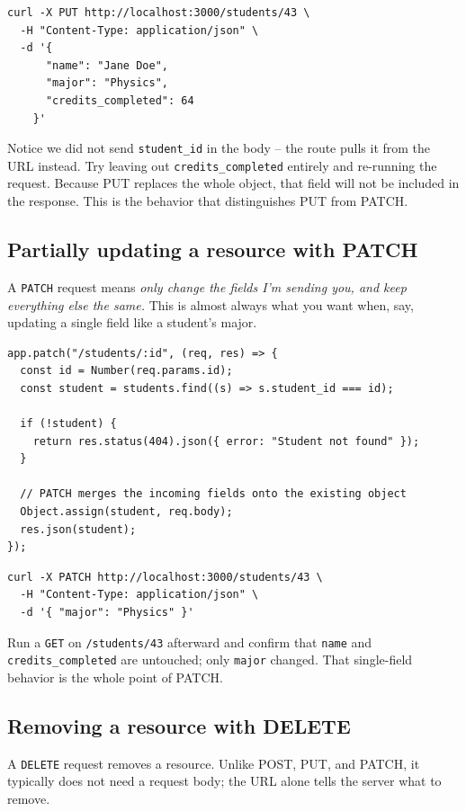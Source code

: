 \begin{verbatim}
curl -X PUT http://localhost:3000/students/43 \
  -H "Content-Type: application/json" \
  -d '{
      "name": "Jane Doe",
      "major": "Physics",
      "credits_completed": 64
    }'
\end{verbatim}

Notice we did not send \texttt{student\_id} in the body -- the route
pulls it from the URL instead. Try leaving out
\texttt{credits\_completed} entirely and re-running the request. Because
PUT replaces the whole object, that field will not be included in the
response. This is the behavior that distinguishes PUT from PATCH.

\subsection{Partially updating a resource with PATCH}

A \texttt{PATCH} request means \emph{only change the fields I'm
  sending you, and keep everything else the same.} This is almost always
what you want when, say, updating a single field like a student's
major.

\begin{verbatim}
app.patch("/students/:id", (req, res) => {
  const id = Number(req.params.id);
  const student = students.find((s) => s.student_id === id);
 
  if (!student) {
    return res.status(404).json({ error: "Student not found" });
  }
 
  // PATCH merges the incoming fields onto the existing object
  Object.assign(student, req.body);
  res.json(student);
});
\end{verbatim}

\begin{verbatim}
curl -X PATCH http://localhost:3000/students/43 \
  -H "Content-Type: application/json" \
  -d '{ "major": "Physics" }'
\end{verbatim}

Run a \texttt{GET} on \texttt{/students/43} afterward and confirm that
\texttt{name} and \texttt{credits\_completed} are untouched; only
\texttt{major} changed. That single-field behavior is the whole point
of PATCH.

\subsection{Removing a resource with DELETE}

A \texttt{DELETE} request removes a resource. Unlike POST, PUT, and
PATCH, it typically does not need a request body; the URL alone
tells the server what to remove.

